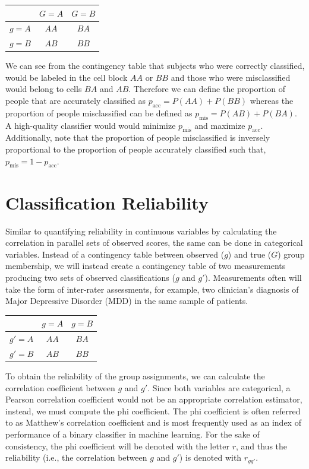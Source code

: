 \documentclass[
  letterpaper,
  DIV=11,
  numbers=noendperiod]{scrreprt}
\begin{document}
\begin{longtable}[]{@{}lcc@{}}
\toprule\noalign{}
& \(G=A\) & \(G=B\) \\
\midrule\noalign{}
\endhead
\bottomrule\noalign{}
\endlastfoot
\(g=A\) & \(AA\) & \(BA\) \\
\(g=B\) & \(AB\) & \(BB\) \\
\end{longtable}

We can see from the contingency table that subjects who were correctly
classified, would be labeled in the cell block \(AA\) or \(BB\) and
those who were misclassified would belong to cells \(BA\) and \(AB\).
Therefore we can define the proportion of people that are accurately
classified as \(p_{\text{acc}} = P(AA) + P(BB)\) whereas the proportion
of people misclassified can be defined as
\(p_{\text{mis}} = P(AB)+ P(BA)\). A high-quality classifier would would
minimize \(p_{\text{mis}}\) and maximize \(p_{\text{acc}}\).
Additionally, note that the proportion of people misclassified is
inversely proportional to the proportion of people accurately classified
such that, \(p_{\text{mis}} = 1-p_{\text{acc}}\).

\hypertarget{classification-reliability}{%
\section{Classification Reliability}\label{classification-reliability}}

Similar to quantifying reliability in continuous variables by
calculating the correlation in parallel sets of observed scores, the
same can be done in categorical variables. Instead of a contingency
table between observed (\(g\)) and true (\(G\)) group membership, we
will instead create a contingency table of two measurements producing
two sets of observed classifications (\(g\) and \(g'\)). Measurements
often will take the form of inter-rater assessments, for example, two
clinician's diagnosis of Major Depressive Disorder (MDD) in the same
sample of patients.

\begin{longtable}[]{@{}ccc@{}}
\toprule\noalign{}
& \(g=A\) & \(g=B\) \\
\midrule\noalign{}
\endhead
\bottomrule\noalign{}
\endlastfoot
\(g'=A\) & \(AA\) & \(BA\) \\
\(g'=B\) & \(AB\) & \(BB\) \\
\end{longtable}

To obtain the reliability of the group assignments, we can calculate the
correlation coefficient between \(g\) and \(g'\). Since both variables
are categorical, a Pearson correlation coefficient would not be an
appropriate correlation estimator, instead, we must compute the phi
coefficient. The phi coefficient is often referred to as Matthew's
correlation coefficient and is most frequently used as an index of
performance of a binary classifier in machine learning. For the sake of
consistency, the phi coefficient will be denoted with the letter \(r\),
and thus the reliability (i.e., the correlation between \(g\) and
\(g'\)) is denoted with \(r_{gg'}\).
\end{document}
